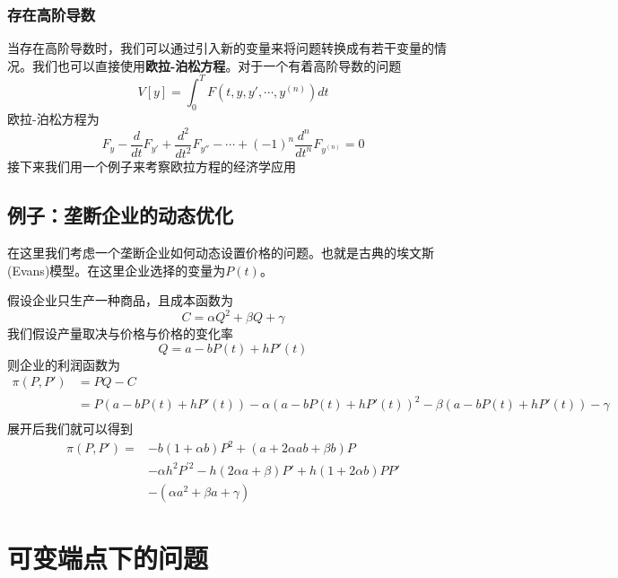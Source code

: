 \documentclass[UTF8,12pt]{ctexart}
\numberwithin{equation}{section} %
\numberwithin{figure}{section}
\numberwithin{table}{section}
\begin{document}
	\subsubsection{存在高阶导数}
	当存在高阶导数时，我们可以通过引入新的变量来将问题转换成有若干变量的情况。我们也可以直接使用\textbf{欧拉-泊松方程}。对于一个有着高阶导数的问题
	\begin{equation}
		V[y] = \int_{0}^{T}F(t,y,y',\cdots,y^{(n)})dt
	\end{equation}
	欧拉-泊松方程为
	\begin{equation}
		F_y - \frac{d}{dt}F_{y'} + \frac{d^2}{dt^2}F_{y''} - \cdots + (-1)^n \frac{d^n}{dt^n}F_{y^{(n)}} = 0 
	\end{equation}
	接下来我们用一个例子来考察欧拉方程的经济学应用
	
	\subsection{例子：垄断企业的动态优化}
	在这里我们考虑一个垄断企业如何动态设置价格的问题。也就是古典的埃文斯(Evans)模型。在这里企业选择的变量为$P(t)$。
	
	假设企业只生产一种商品，且成本函数为
	\begin{equation}
		C = \alpha Q^2 + \beta Q + \gamma 
	\end{equation}
	我们假设产量取决与价格与价格的变化率
	\begin{equation}
		Q = a - b P(t) + h P'(t)
	\end{equation}
	则企业的利润函数为
	\begin{equation}
		\begin{aligned}
			\pi(P,P') &= PQ - C \\
			&=P(a - b P(t) + h P'(t)) - \alpha(a - b P(t) + h P'(t))^2 - \beta(a - b P(t) + h P'(t)) - \gamma \\
		\end{aligned}
	\end{equation}
	展开后我们就可以得到
	\begin{equation}
		\begin{aligned}
			\pi(P,P') = & -b(1 + \alpha b)P^2 + (a + 2\alpha ab + \beta b)P \\
			&-\alpha h^2 P^{'2} - h(2\alpha a + \beta)P' + h(1 + 2\alpha b)PP' \\
			&-(\alpha a^2 + \beta a + \gamma)
		\end{aligned}
	\end{equation}

	\section{可变端点下的问题}
\end{document}
